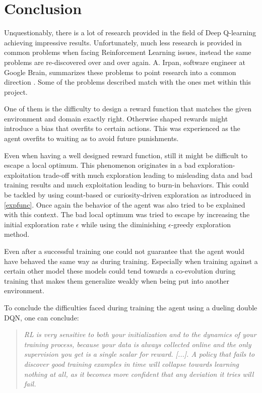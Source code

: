 \section{Conclusion} \label{conclusion}


Unquestionably, there is a lot of research provided in the field of Deep Q-learning achieving impressive results. Unfortunately, much less research is provided in common problems when facing Reinforcement Learning issues, instead the same problems are re-discovered over and over again. A. Irpan, software engineer at Google Brain, summarizes these problems to point research into a common direction \cite{Irpan2018}. Some of the problems described match with the ones met within this project.

One of them is the difficulty to design a reward function that matches the given environment and domain exactly right. Otherwise shaped rewards might introduce a bias that overfits to certain actions. This was experienced as the agent overfits to waiting as to avoid future punishments. 

Even when having a well designed reward function, still it might be difficult to escape a local optimum. This phenomenon originates in a bad exploration-exploitation trade-off with much exploration leading to misleading data and bad training results and much exploitation leading to burn-in behaviors. This could be tackled by using count-based or curiosity-driven exploration as introduced in \autoref{expfunc}. Once again the behavior of the agent was also tried to be explained with this context. The bad local optimum was tried to escape by increasing the initial exploration rate $\epsilon$ while using the diminishing $\epsilon$-greedy exploration method. 

Even after a successful training one could not guarantee that the agent would have behaved the same way as during training. Especially when training against a certain other model these models could tend towards a co-evolution during training that makes them generalize weakly when being put into another environment. 

To conclude the difficulties faced during training the agent using a dueling double DQN, one can conclude: 

\begin{quote}
	\textit{\grqq[...] RL is very sensitive to both your initialization and to the dynamics of your training process, because your data is always collected online and the only supervision you get is a single scalar for reward. [...]. A policy that fails to discover good training examples in time will collapse towards learning nothing at all, as it becomes more confident that any deviation it tries will fail.\grqq} \cite{Irpan2018}
\end{quote}


